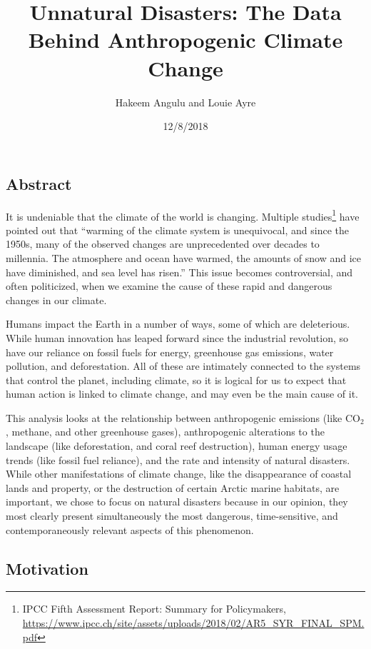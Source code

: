 \documentclass[10pt,]{article}
\title{Unnatural Disasters: The Data Behind Anthropogenic Climate Change}
\author{Hakeem Angulu and Louie Ayre}
\date{12/8/2018}
\let\rmarkdownfootnote\footnote%
\def\footnote{\protect\rmarkdownfootnote}
\begin{document}
\maketitle

\subsection{Abstract}\label{abstract}

It is undeniable that the climate of the world is changing. Multiple
studies\footnote{IPCC Fifth Assessment Report: Summary for Policymakers,
  \url{https://www.ipcc.ch/site/assets/uploads/2018/02/AR5_SYR_FINAL_SPM.pdf}}
have pointed out that ``warming of the climate system is unequivocal,
and since the 1950s, many of the observed changes are unprecedented over
decades to millennia. The atmosphere and ocean have warmed, the amounts
of snow and ice have diminished, and sea level has risen.'' This issue
becomes controversial, and often politicized, when we examine the cause
of these rapid and dangerous changes in our climate.

Humans impact the Earth in a number of ways, some of which are
deleterious. While human innovation has leaped forward since the
industrial revolution, so have our reliance on fossil fuels for energy,
greenhouse gas emissions, water pollution, and deforestation. All of
these are intimately connected to the systems that control the planet,
including climate, so it is logical for us to expect that human action
is linked to climate change, and may even be the main cause of it.

This analysis looks at the relationship between anthropogenic emissions
(like CO\(_2\), methane, and other greenhouse gases), anthropogenic
alterations to the landscape (like deforestation, and coral reef
destruction), human energy usage trends (like fossil fuel reliance), and
the rate and intensity of natural disasters. While other manifestations
of climate change, like the disappearance of coastal lands and property,
or the destruction of certain Arctic marine habitats, are important, we
chose to focus on natural disasters because in our opinion, they most
clearly present simultaneously the most dangerous, time-sensitive, and
contemporaneously relevant aspects of this phenomenon.

\subsection{Motivation}\label{motivation}
\end{document}
